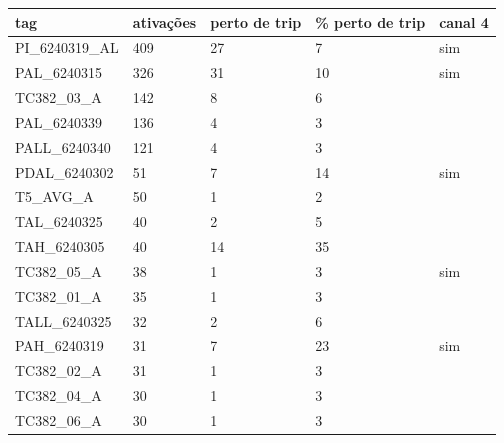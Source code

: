\begin{tabular}{lllll}
\toprule
tag & ativações & perto de trip & \% perto de trip & canal 4 \\
\midrule
PI\_6240319\_AL & 409 & 27 & 7 & sim \\
PAL\_6240315 & 326 & 31 & 10 & sim \\
TC382\_03\_A & 142 & 8 & 6 &  \\
PAL\_6240339 & 136 & 4 & 3 &  \\
PALL\_6240340 & 121 & 4 & 3 &  \\
PDAL\_6240302 & 51 & 7 & 14 & sim \\
T5\_AVG\_A & 50 & 1 & 2 &  \\
TAL\_6240325 & 40 & 2 & 5 &  \\
TAH\_6240305 & 40 & 14 & 35 &  \\
TC382\_05\_A & 38 & 1 & 3 & sim \\
TC382\_01\_A & 35 & 1 & 3 &  \\
TALL\_6240325 & 32 & 2 & 6 &  \\
PAH\_6240319 & 31 & 7 & 23 & sim \\
TC382\_02\_A & 31 & 1 & 3 &  \\
TC382\_04\_A & 30 & 1 & 3 &  \\
TC382\_06\_A & 30 & 1 & 3 &  \\
\bottomrule
\end{tabular}
